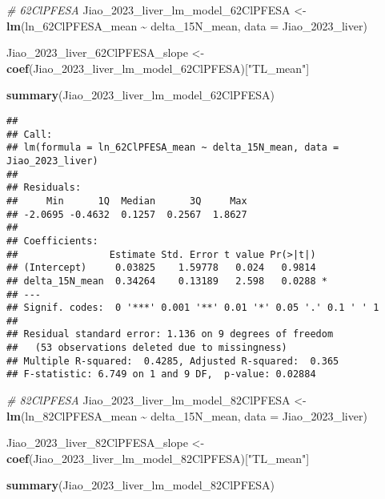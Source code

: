 \documentclass[
]{article}
\newenvironment{Shaded}{\begin{snugshade}}{\end{snugshade}}
\newcommand{\AttributeTok}[1]{\textcolor[rgb]{0.13,0.29,0.53}{#1}}
\newcommand{\CommentTok}[1]{\textcolor[rgb]{0.56,0.35,0.01}{\textit{#1}}}
\newcommand{\FunctionTok}[1]{\textcolor[rgb]{0.13,0.29,0.53}{\textbf{#1}}}
\newcommand{\NormalTok}[1]{#1}
\newcommand{\OtherTok}[1]{\textcolor[rgb]{0.56,0.35,0.01}{#1}}
\newcommand{\SpecialCharTok}[1]{\textcolor[rgb]{0.81,0.36,0.00}{\textbf{#1}}}
\newcommand{\StringTok}[1]{\textcolor[rgb]{0.31,0.60,0.02}{#1}}
\begin{document}
\begin{Shaded}
\begin{Highlighting}[]
\CommentTok{\# 62ClPFESA}
\NormalTok{Jiao\_2023\_liver\_lm\_model\_62ClPFESA }\OtherTok{\textless{}{-}} \FunctionTok{lm}\NormalTok{(ln\_62ClPFESA\_mean }\SpecialCharTok{\textasciitilde{}}\NormalTok{ delta\_15N\_mean,}
                                    \AttributeTok{data =}\NormalTok{ Jiao\_2023\_liver)}

\NormalTok{Jiao\_2023\_liver\_62ClPFESA\_slope }\OtherTok{\textless{}{-}} \FunctionTok{coef}\NormalTok{(Jiao\_2023\_liver\_lm\_model\_62ClPFESA)[}\StringTok{"TL\_mean"}\NormalTok{]}

\FunctionTok{summary}\NormalTok{(Jiao\_2023\_liver\_lm\_model\_62ClPFESA)}
\end{Highlighting}
\end{Shaded}

\begin{verbatim}
## 
## Call:
## lm(formula = ln_62ClPFESA_mean ~ delta_15N_mean, data = Jiao_2023_liver)
## 
## Residuals:
##     Min      1Q  Median      3Q     Max 
## -2.0695 -0.4632  0.1257  0.2567  1.8627 
## 
## Coefficients:
##                Estimate Std. Error t value Pr(>|t|)  
## (Intercept)     0.03825    1.59778   0.024   0.9814  
## delta_15N_mean  0.34264    0.13189   2.598   0.0288 *
## ---
## Signif. codes:  0 '***' 0.001 '**' 0.01 '*' 0.05 '.' 0.1 ' ' 1
## 
## Residual standard error: 1.136 on 9 degrees of freedom
##   (53 observations deleted due to missingness)
## Multiple R-squared:  0.4285, Adjusted R-squared:  0.365 
## F-statistic: 6.749 on 1 and 9 DF,  p-value: 0.02884
\end{verbatim}

\begin{Shaded}
\begin{Highlighting}[]
\CommentTok{\# 82ClPFESA}
\NormalTok{Jiao\_2023\_liver\_lm\_model\_82ClPFESA }\OtherTok{\textless{}{-}} \FunctionTok{lm}\NormalTok{(ln\_82ClPFESA\_mean }\SpecialCharTok{\textasciitilde{}}\NormalTok{ delta\_15N\_mean,}
                                    \AttributeTok{data =}\NormalTok{ Jiao\_2023\_liver)}

\NormalTok{Jiao\_2023\_liver\_82ClPFESA\_slope }\OtherTok{\textless{}{-}} \FunctionTok{coef}\NormalTok{(Jiao\_2023\_liver\_lm\_model\_82ClPFESA)[}\StringTok{"TL\_mean"}\NormalTok{]}

\FunctionTok{summary}\NormalTok{(Jiao\_2023\_liver\_lm\_model\_82ClPFESA)}
\end{Highlighting}
\end{Shaded}
\end{document}

